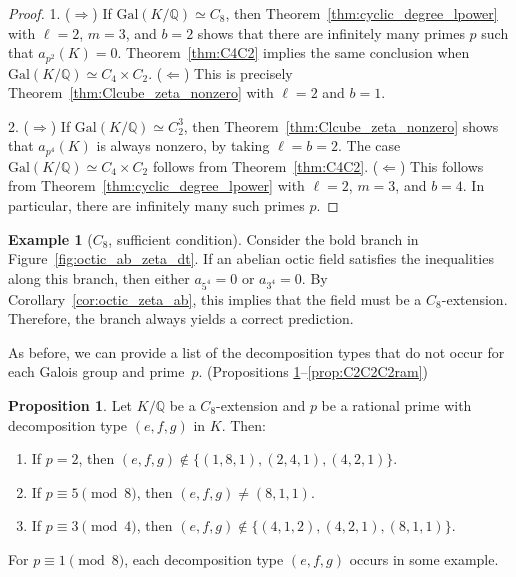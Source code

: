 \documentclass[letterpaper, 10pt]{article}
\newcommand{\Gal}{\mathrm{Gal}}
\newcommand{\bQ}{\mathbb{Q}}
\newcommand{\1}{\mathds{1}}	%
\theoremstyle{definition}
\newtheorem{proposition}[theorem]{Proposition}
\newtheorem{example}[theorem]{Example}
\theoremstyle{remark}
\begin{document}
\begin{proof}
        1. ($\Rightarrow$) If \( \Gal(K / \mathbb{Q}) \simeq C_8 \), then Theorem~\ref{thm:cyclic_degree_lpower} with \( \ell = 2 \), \( m = 3 \), and \( b = 2 \) shows that there are infinitely many primes \( p \) such that \( a_{p^2}(K) = 0 \).  
Theorem~\ref{thm:C4C2} implies the same conclusion when \( \Gal(K / \mathbb{Q}) \simeq C_4 \times C_2 \).
($\Leftarrow$) This is precisely Theorem~\ref{thm:Clcube_zeta_nonzero} with \( \ell = 2 \) and \( b = 1 \).

       2. ($\Rightarrow$) If \( \Gal(K / \mathbb{Q}) \simeq C_2^3 \), then Theorem~\ref{thm:Clcube_zeta_nonzero} shows that \( a_{p^4}(K) \) is always nonzero, by taking \( \ell = b = 2 \).  
The case \( \Gal(K / \mathbb{Q}) \simeq C_4 \times C_2 \) follows from Theorem~\ref{thm:C4C2}.
($\Leftarrow$) This follows from Theorem~\ref{thm:cyclic_degree_lpower} with \( \ell = 2 \), \( m = 3 \), and \( b = 4 \). In particular, there are infinitely many such primes \( p \).
\end{proof}

\begin{example}[$C_8$,  sufficient condition]
   Consider the bold branch in Figure~\ref{fig:octic_ab_zeta_dt}.  
If an abelian octic field satisfies the inequalities along this branch, then either \( a_{5^4} = 0 \) or \( a_{3^4} = 0 \).  
By Corollary~\ref{cor:octic_zeta_ab}, this implies that the field must be a \( C_8 \)-extension.  
Therefore, the branch always yields a correct prediction.
\end{example}

As before, we can provide a list of the decomposition types that do not occur for each Galois group and prime~$p$. (Propositions \ref{prop:C8ram}--\ref{prop:C2C2C2ram})

\begin{proposition}
    \label{prop:C8ram}
    Let $K / \bQ$ be a $C_8$-extension and $p$ be a rational prime with decomposition type $(e, f, g)$ in $K$. Then: 
    \begin{enumerate}
        \item If $p = 2$, then $(e, f, g) \not \in \{(1, 8, 1), (2, 4, 1), (4, 2, 1)\}$.
        \item If $p \equiv 5 \pmod{8}$, then $(e, f, g) \ne (8, 1, 1)$.
        \item If $p \equiv 3 \pmod{4}$, then $(e, f, g) \not \in \{(4, 1, 2), (4, 2, 1), (8, 1, 1)\}$.
    \end{enumerate}
 For $p \equiv1 \pmod{8}$, each decomposition type $(e, f, g)$ occurs in some example.
\end{proposition}
\end{document}
